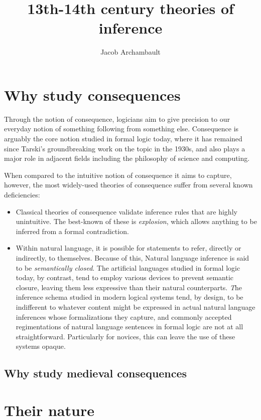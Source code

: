 \documentclass[]{article}
\title{13th-14th century theories of inference}
\author{Jacob Archambault}
\begin{document}
\maketitle

\section{Why study consequences}
Through the notion of consequence, logicians aim to give precision to our everyday notion of something following from something else. Consequence is arguably the core notion studied in formal logic today, where it has remained since Tarski's groundbreaking work on the topic in the 1930s, and also plays a major role in adjacent fields including the philosophy of science and computing. 

When compared to the intuitive notion of consequence it aims to capture, however, the most widely-used theories of consequence suffer from several known deficiencies: 
\begin{itemize}
	\item Classical theories of consequence validate inference rules that are highly unintuitive. The best-known of these is \emph{explosion}, which allows anything to be inferred from a formal contradiction.
	\item Within natural language, it is possible for statements to refer, directly or indirectly, to themselves. Because of this, Natural language inference is said to be \emph{semantically closed}. The artificial languages studied in formal logic today, by contrast, tend to employ various devices to prevent semantic closure, leaving them less expressive than their natural counterparts.
	\emph The inference schema studied in modern logical systems tend, by design, to be indifferent to whatever content might be expressed in actual natural language inferences whose formalizations they capture, and commonly accepted regimentations of natural language sentences in formal logic are not at all straightforward. Particularly for novices, this can leave the use of these systems opaque. 
\end{itemize}

\subsection{Why study medieval consequences}
\section{Their nature}
\end{document}
